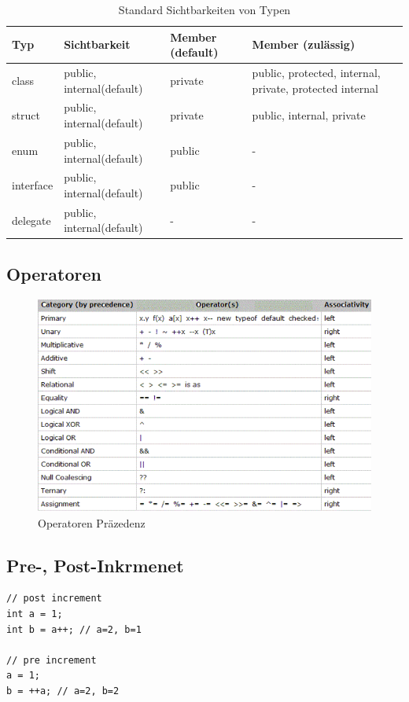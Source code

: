 \documentclass[
a4paper,
oneside,
10pt,
fleqn,
headsepline,
toc=listofnumbered, 
bibliography=totocnumbered]{scrartcl}
\begin{document}
\begin{table}[h]
	\centering
	\begin{tabu} to \linewidth {l l l X}
		\toprule 
		Typ & Sichtbarkeit & Member (default) & Member (zulässig)\\
		\midrule
		class & public, internal(default) & private & public, protected, internal, private, protected internal \\
		struct & public, internal(default) & private & public, internal, private \\	
		enum & public, internal(default) & public & - \\
		interface & public, internal(default) & public & - \\
		delegate & public, internal(default) & - & - \\
		\bottomrule
	\end{tabu} 
	\caption{Standard Sichtbarkeiten von Typen}
\end{table}

\newpage

\subsection{Operatoren}
\begin{figure}[h!]
\centering
\includegraphics[width=\linewidth]{images/operator_prezedenz}
\caption{Operatoren Präzedenz}
\label{fig:operatorprezedenz}
\end{figure}

\clearpage

\subsection{Pre-, Post-Inkrmenet}
\begin{lstlisting}
// post increment
int a = 1;
int b = a++; // a=2, b=1

// pre increment
a = 1;
b = ++a; // a=2, b=2
\end{lstlisting}
\end{document}
